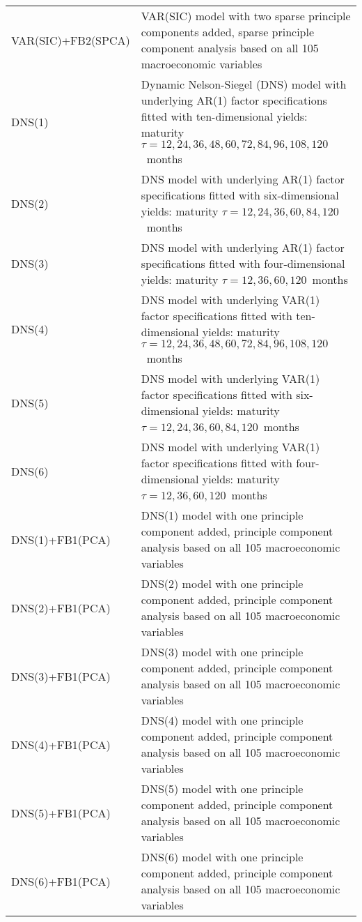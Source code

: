 \begin{table}[h]
{\begin{tabular}{ll}
VAR(SIC)+FB2(SPCA)        & VAR(SIC) model with two sparse principle components added, sparse principle component analysis based on all 105 macroeconomic variables \\
DNS(1)                    & Dynamic Nelson-Siegel (DNS) model with underlying AR(1) factor specifications fitted with ten-dimensional yields: maturity $\tau = 12, 24, 36, 48, 60, 72, 84, 96, 108, 120$\ months \\
DNS(2)                    & DNS model with underlying AR(1) factor specifications fitted with six-dimensional yields: maturity $\tau = 12, 24, 36, 60, 84, 120$\ months  \\
DNS(3)                    & DNS model with underlying AR(1) factor specifications fitted with four-dimensional yields: maturity $\tau = 12, 36, 60, 120$\ months         \\
DNS(4)                    & DNS model with underlying VAR(1) factor specifications fitted with ten-dimensional yields: maturity $\tau = 12, 24, 36, 48, 60, 72, 84, 96, 108, 120$\ months \\
DNS(5)                    & DNS model with underlying VAR(1) factor specifications fitted with six-dimensional yields: maturity $\tau = 12, 24, 36, 60, 84, 120$\ months \\
DNS(6)                    & DNS model with underlying VAR(1) factor specifications fitted with four-dimensional yields: maturity $\tau = 12, 36, 60, 120$\ months        \\ 
DNS(1)+FB1(PCA)           & DNS(1) model with one principle component added, principle component analysis based on all 105 macroeconomic variables \\
DNS(2)+FB1(PCA)           & DNS(2) model with one principle component added, principle component analysis based on all 105 macroeconomic variables \\
DNS(3)+FB1(PCA)           & DNS(3) model with one principle component added, principle component analysis based on all 105 macroeconomic variables \\
DNS(4)+FB1(PCA)           & DNS(4) model with one principle component added, principle component analysis based on all 105 macroeconomic variables \\
DNS(5)+FB1(PCA)           & DNS(5) model with one principle component added, principle component analysis based on all 105 macroeconomic variables \\
DNS(6)+FB1(PCA)           & DNS(6) model with one principle component added, principle component analysis based on all 105 macroeconomic variables \\

\end{tabular}}
\end{table}
